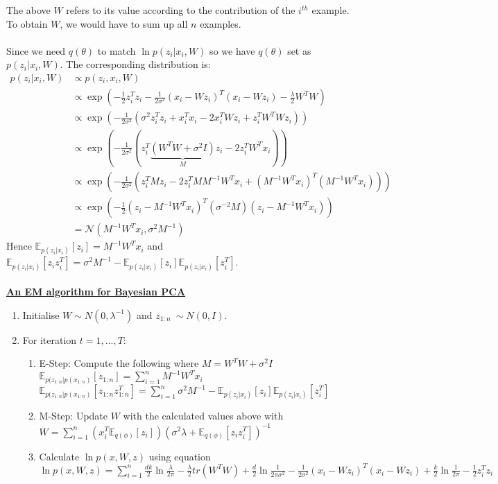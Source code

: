 \documentclass[twoside]{homework}
\begin{document}
The above $W$ refers to its value according to the contribution of the $i^{th}$ example. To obtain $W$, we would have to sum up all $n$ examples.
\\ \\
Since we need $q(\theta)$ to match $\ln p(z_i | x_{i}, W)$ so we have $q(\theta)$ set as $p(z_i | x_i, W)$. The corresponding distribution is:
\begin{align*}
p(z_i | x_i, W)
&\propto p(z_i, x_i, W) \\
&\propto \exp(-\frac{1}{2} z_i^T z_i - \frac{1}{2 \sigma^2}(x_i - Wz_i)^T(x_i - Wz_i) - \frac{\lambda}{2}W^T W)\\
&\propto \exp(-\frac{1}{2 \sigma^2}(\sigma^2 z_i^T z_i + x_i^T x_i  - 2x_i^T Wz_i + z_i^T W^T Wz_i))\\
&\propto \exp(-\frac{1}{2 \sigma^2}(z_i^T \underbrace{(W^T W + \sigma^2 I)}_{M} z_i - 2z_i^T W^T x_i))\\
&\propto \exp(-\frac{1}{2 \sigma^2}(z_i^T M  z_i - 2z_i^T M M^{-1} W^Tx_i + (M^{-1} W^T x_i)^T(M^{-1} W^T x_i)))\\
&\propto \exp(-\frac{1}{2}(z_i - M^{-1} W^T x_i)^T (\sigma^{-2}M)(z_i - M^{-1} W^T x_i))\\
&= \mathcal{N}(M^{-1} W^T x_i, \sigma^{2} M^{-1})
\end{align*}
Hence $\mathbb{E}_{p(z_i | x_i)}[z_i] = M^{-1} W^T x_i$ and $\mathbb{E}_{p(z_i | x_i)}[z_i z_i^T] = \sigma^{2} M^{-1} - \mathbb{E}_{p(z_i | x_i)}[z_i] \mathbb{E}_{p(z_i | x_i)}[z_i^T]$.
\\ \\
\textbf{\underline{An EM algorithm for Bayesian PCA}}
\begin{enumerate}
\item Initialise $W \sim N(0, \lambda^{-1})$ and $z_{1:n} ~ \sim N(0, I)$.
\item For iteration $t= 1, ..., T$:
\begin{enumerate}
\item E-Step: Compute the following where $M = W^T W + \sigma^2 I$ \\
$\mathbb{E}_{p(z_{1:n} | p(x_{1:n})}[z_{1:n}] = \sum_{i=1}^n M^{-1} W^T x_i$ \\ 
$\mathbb{E}_{p(z_{1:n} | p(x_{1:n})}[z_{1:n} z_{1:n}^T] = \sum_{i=1}^n \sigma^{2} M^{-1} - \mathbb{E}_{p(z_i | x_i)}[z_i] \mathbb{E}_{p(z_i | x_i)}[z_i^T]$
\item M-Step: Update $W$ with the calculated values above with\\
$W = \sum_{i=1}^n(x_i^T \mathbb{E}_{q(\phi)}[z_i])(\sigma^2 \lambda + \mathbb{E}_{q(\phi)}[z_i z_i^T])^{-1}$
\item Calculate $\ln p(x, W, z)$ using equation \\
$\ln p(x, W, z) = \sum_{i=1}^n \frac{dk}{2}\ln \frac{\lambda}{2\pi} - \frac{\lambda}{2} tr(W^T W)+ \frac{d}{2}\ln \frac{1}{2\pi \sigma^2} - \frac{1}{2 \sigma^2}(x_i - Wz_i)^T (x_i - Wz_i) + \frac{k}{2}\ln \frac{1}{2\pi} - \frac{1}{2}z_i^T z_i$
\end{enumerate}
\end{enumerate}
\end{document}
